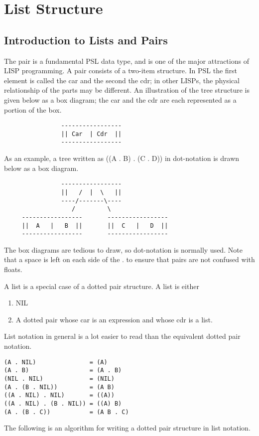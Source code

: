 
\chapter*{List Structure}

\section{Introduction to Lists and Pairs}

  The  pair  is  a  fundamental PSL data type, and is one of the
major attractions of LISP programming.  A  pair  consists  of  a
two-item  structure.  In PSL the first element is called the car
and  the  second  the  cdr;  in  other   LISPs,   the   physical
relationship  of the parts may be different.  An illustration of
the tree structure is given below as a box diagram; the car  and
the cdr are each represented as a portion of the box.

\begin{verbatim}
                -----------------
                || Car  | Cdr  ||
                -----------------
\end{verbatim}
As  an  example,  a  tree    written  as  ((A . B) . (C . D)) in
dot-notation is drawn below as a box diagram.

\begin{verbatim}
                -----------------
                ||   /  |  \   ||
                ----/-------\----
                   /         \
     -----------------       -----------------
     ||  A   |   B  ||       ||  C   |   D  ||
     -----------------       -----------------
\end{verbatim}
  The box diagrams are  tedious  to  draw,  so  dot-notation  is
normally  used.  Note that a space is left on each side of the .
to ensure that pairs are not confused with floats.

  A list is a special case of a dotted pair structure.   A  list
is either


\begin{enumerate}
\item  NIL
\item  A dotted pair whose car is an expression and whose cdr is a
     list.
\end{enumerate}
List  notation  in  general  is  a  lot  easier to read than the
equivalent dotted pair notation.

\begin{verbatim}
(A . NIL)               = (A)
(A . B)                 = (A . B)
(NIL . NIL)             = (NIL)
(A . (B . NIL))         = (A B)
((A . NIL) . NIL)       = ((A))
((A . NIL) . (B . NIL)) = ((A) B)
(A . (B . C))           = (A B . C)
\end{verbatim}
  The following is  an  algorithm  for  writing  a  dotted  pair
structure in list notation.


